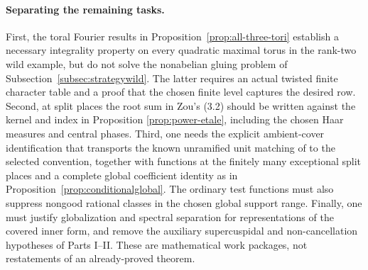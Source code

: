 \documentclass[11pt]{article}
\theoremstyle{plain}
\theoremstyle{definition}
\begin{document}
\paragraph{Separating the remaining tasks.}
First, the toral Fourier results in
Proposition~\ref{prop:all-three-tori} establish a necessary
integrality property on every quadratic maximal torus in the
rank-two wild example, but do not solve the nonabelian gluing
problem of Subsection~\ref{subsec:strategywild}.  The latter
requires an actual twisted finite character table and a proof
that the chosen finite level captures the desired row.  Second, at split
places the root sum in Zou's (3.2) should be written against the
kernel and index in Proposition \ref{prop:power-etale}, including
the chosen Haar measures and central phases.  Third, one needs the explicit ambient-cover identification
that transports the known unramified unit matching of
\cite[\S12]{FK} to the selected convention, together with
functions at the finitely many exceptional split places and a
complete global coefficient identity as in
Proposition~\ref{prop:conditionalglobal}. The ordinary test
functions must also suppress nongood rational classes in the
chosen global support range.
Finally, one must justify globalization and spectral separation
for representations of the covered inner form, and remove the
auxiliary supercuspidal and non-cancellation hypotheses of Parts
I--II.  These are mathematical work packages, not restatements of
an already-proved theorem.
\end{document}
